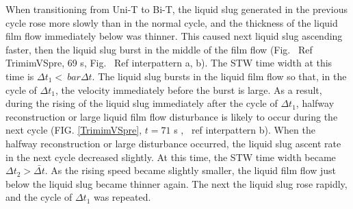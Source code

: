 \documentclass[aps,pre,preprint,groupedaddress,showkeys]{revtex4-2}
\begin{document}
When transitioning from Uni-T to Bi-T, the liquid slug generated in the previous cycle rose more slowly than in the normal cycle, and the thickness of the liquid film flow immediately below was thinner.
This caused next liquid slug ascending faster, then the liquid slug burst in the middle of the film flow (Fig. \ Ref {TrimimVSpre}, 69 s, Fig. \ Ref {interpattern} a, b).
The STW time width at this time is $ \Delta t_ {1} <\ bar {\Delta t} $.
The liquid slug bursts in the liquid film flow so that, in the cycle of $ \Delta t_ {1} $, the velocity immediately before the burst is large.
As a result, during the rising of the liquid slug immediately after the cycle of $ \Delta t_ {1} $, halfway reconstruction or large liquid film flow disturbance is likely to occur during the next cycle (FIG. \ref{TrimimVSpre}, $ t = 71 $ s , \ ref {interpattern} b).
When the halfway reconstruction or large disturbance occurred, the liquid slug ascent rate in the next cycle decreased slightly.
At this time, the STW time width became $ \Delta t_ {2}> \bar{\Delta t} $. 
As the rising speed became slightly smaller, the liquid film flow just below the liquid slug became thinner again.
The next the liquid slug rose rapidly, and the cycle of $ \Delta t_ {1} $ was repeated.
\end{document}
